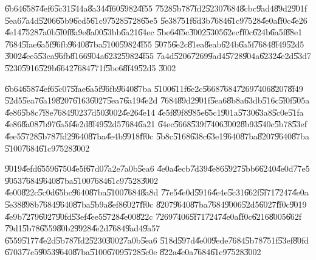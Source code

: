 \documentclass[12pt,a4paper]{article}
\begin{document}
\bigskip

\U{6b64}\U{6587}\U{4ef6}\U{5c31}\U{544a}\U{8a34}\U{4f60}\U{5982}\U{4f55}%
\U{7528}\U{5b78}\U{7fd2}\U{5230}\U{7684}\U{8cbc}\U{9ad4}\U{89d2}\U{901f}%
\U{5ea6}\U{7a4d}\U{5206}\U{65b9}\U{6cd5}\U{61c9}\U{7528}\U{5728}\U{65e5}%
\U{5e38}\U{751f}\U{6d3b}\U{7684}\U{61c9}\U{7528}\U{4e0a}\U{ff0c}\U{4e26}%
\U{4e14}\U{7528}\U{7a0b}\U{5f0f}\U{8a9e}\U{8a00}\U{53bb}\U{6a21}\U{64ec}%
\U{5be6}\U{4f5c}\U{3002}\U{5305}\U{62ec}\U{ff0c}\U{624b}\U{6a5f}\U{88e1}%
\U{7684}\U{5fae}\U{6a5f}\U{96fb}\U{9640}\U{87ba}\U{5100}\U{5982}\U{4f55}%
\U{5075}\U{6e2c}\U{81ea}\U{8eab}\U{624b}\U{6a5f}\U{7684}\U{8f49}\U{52d5}%
\U{3002}\U{4ee5}\U{53ca}\U{96fb}\U{8166}\U{904a}\U{6232}\U{5982}\U{4f55}%
\U{7a4d}\U{5206}\U{7269}\U{9ad4}\U{5728}\U{904a}\U{6232}\U{4e2d}\U{53d7}%
\U{5230}\U{5916}\U{529b}\U{6642}\U{7684}\U{771f}\U{5be6}\U{8f49}\U{52d5}%
\U{3002}

\bigskip

\U{6b64}\U{6587}\U{4ef6}\U{5c07}\U{5fae}\U{6a5f}\U{96fb}\U{9640}\U{87ba}%
\U{5100}\U{611f}\U{6e2c}\U{5668}\U{7684}\U{7269}\U{7406}\U{8207}\U{8f49}%
\U{52d5}\U{5ea7}\U{6a19}\U{8207}\U{6163}\U{6027}\U{5ea7}\U{6a19}\U{4e2d}%
\U{7684}\U{89d2}\U{901f}\U{5ea6}\U{8b8a}\U{63db}\U{516c}\U{5f0f}\U{505a}%
\U{4e86}\U{5b8c}\U{7f8e}\U{7684}\U{9023}\U{7d50}\U{3002}\U{4e26}\U{4e14}%
\U{4e5f}\U{89f8}\U{985e}\U{65c1}\U{901a}\U{5730}\U{63a8}\U{5c0e}\U{51fa}%
\U{4e86}\U{8a08}\U{7b97}\U{6a5f}\U{4e2d}\U{8f49}\U{52d5}\U{7684}\U{6a21}%
\U{64ec}\U{5668}\U{539f}\U{7406}\U{3002}\U{8b93}\U{540c}\U{5b78}\U{53ef}%
\U{4ee5}\U{5728}\U{5b78}\U{7fd2}\U{9640}\U{87ba}\U{4e4b}\U{9918}\U{ff0c}%
\U{5b8c}\U{5168}\U{638c}\U{63e1}\U{9640}\U{87ba}\U{8207}\U{9640}\U{87ba}%
\U{5100}\U{7684}\U{61c9}\U{7528}\U{3002}

\bigskip

\U{9019}\U{4efd}\U{6559}\U{6750}\U{4e5f}\U{67d0}\U{7a2e}\U{7a0b}\U{5ea6}%
\U{4e0a}\U{4ecb}\U{7d39}\U{4e86}\U{5927}\U{5bb6}\U{6240}\U{4e0d}\U{77e5}%
\U{9053}\U{7684}\U{9640}\U{87ba}\U{5100}\U{7684}\U{61c9}\U{7528}\U{3002}%
\U{4e00}\U{822c}\U{5c0d}\U{65bc}\U{9640}\U{87ba}\U{5100}\U{7684}\U{8a8d}%
\U{77e5}\U{4e0d}\U{5916}\U{4e4e}\U{5c31}\U{662f}\U{5f71}\U{7247}\U{4e0a}%
\U{5e38}\U{898b}\U{7684}\U{9640}\U{87ba}\U{5b9a}\U{8ef8}\U{6027}\U{ff0c}%
\U{8207}\U{9640}\U{87ba}\U{7684}\U{9006}\U{52d5}\U{6027}\U{ff0c}\U{9019}%
\U{4e9b}\U{7279}\U{6027}\U{90fd}\U{53ef}\U{4ee5}\U{5728}\U{4e00}\U{822c}%
\U{7269}\U{7406}\U{5f71}\U{7247}\U{4e0a}\U{ff0c}\U{6216}\U{8005}\U{662f}%
\U{79d1}\U{5b78}\U{6559}\U{80b2}\U{9928}\U{4e2d}\U{7684}\U{9ad4}\U{9a57}%
\U{6559}\U{5177}\U{4e2d}\U{5b78}\U{7fd2}\U{5230}\U{3002}\U{7a0b}\U{5ea6}%
\U{518d}\U{597d}\U{4e00}\U{9ede}\U{7684}\U{5b78}\U{751f}\U{53ef}\U{80fd}%
\U{6703}\U{77e5}\U{9053}\U{9640}\U{87ba}\U{5100}\U{6709}\U{5728}\U{5c0e}%
\U{822a}\U{4e0a}\U{7684}\U{61c9}\U{7528}\U{3002}
\end{document}

